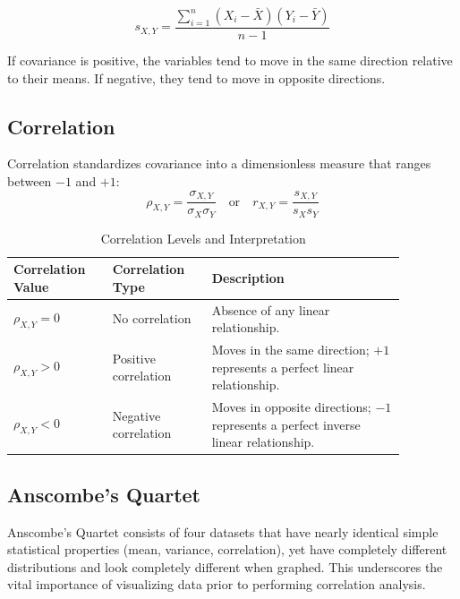 \begin{equation}
	s_{X,Y} = \frac{\sum_{i=1}^{n} (X_i - \bar{X})(Y_i - \bar{Y})}{n-1}
	\label{eq:sample_covariance_m5}
\end{equation}

If covariance is positive, the variables tend to move in the same direction relative to their means. If negative, they tend to move in opposite directions.

\subsection{Correlation}
	\label{subsec:Correlation}
Correlation standardizes covariance into a dimensionless measure that ranges between $-1$ and $+1$:
\begin{equation}
	\rho_{X,Y} = \frac{\sigma_{X,Y}}{\sigma_X \sigma_Y} \quad \text{or} \quad r_{X,Y} = \frac{s_{X,Y}}{s_X s_Y}
	\label{eq:correlation_coefficient_m5}
\end{equation}

\begin{table}[!htbp]
\centering
\caption{Correlation Levels and Interpretation}
\label{tab:correlation_levels_m5}
\begin{tabular}{p{0.22\linewidth} p{0.22\linewidth} p{0.43\linewidth}}
\toprule
\textbf{Correlation Value} & \textbf{Correlation Type} & \textbf{Description} \\
\midrule
$\rho_{X,Y} = 0$ & No correlation & Absence of any linear relationship. \\
$\rho_{X,Y} > 0$ & Positive correlation & Moves in the same direction; $+1$ represents a perfect linear relationship. \\
$\rho_{X,Y} < 0$ & Negative correlation & Moves in opposite directions; $-1$ represents a perfect inverse linear relationship. \\
\bottomrule
\end{tabular}
\end{table}

\subsection{Anscombe's Quartet}
	\label{subsec:Anscombe's Quartet}
Anscombe's Quartet consists of four datasets that have nearly identical simple statistical properties (mean, variance, correlation), yet have completely different distributions and look completely different when graphed. This underscores the vital importance of visualizing data prior to performing correlation analysis.

